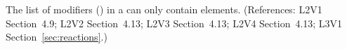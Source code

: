 The list of modifiers () in a \Reaction can only
contain  elements.  (References: L2V1
Section~4.9; L2V2 Section~4.13; L2V3 Section~4.13; L2V4 Section~4.13; 
L3V1 Section~\ref{sec:reactions}.)
